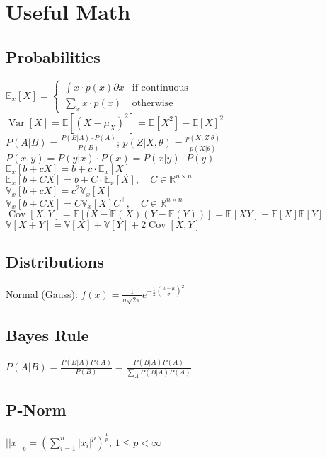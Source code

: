 \section*{Useful Math}

\subsection*{Probabilities}
$\mathbb{E}_x[X] = \begin{cases}
   \int x \cdot p(x) \partial x  & \text{if continuous}\\
   \sum_x x \cdot p(x) & \text{otherwise}
  \end{cases}$\\
$\operatorname{Var}[X] = \mathbb{E}[(X-\mu_X)^2] = \mathbb{E}[X^2] - \mathbb{E}[X]^2$\\
$P(A|B) = \frac{P(B|A) \cdot P(A)}{P(B)}$; $p(Z|X,\theta) = \frac{p(X,Z|\theta)}{p(X|\theta)}$\\
$P(x,y) = P(y|x) \cdot  P(x) = P(x|y) \cdot P(y)$ \\
$\mathbb{E}_x[b+ cX] = b+c\cdot \mathbb{E}_x[X]$ \\
$\mathbb{E}_x[b+ CX] = b+C\cdot\mathbb{E}_x[X],\quad C \in \mathbb{R}^{n\times n}$ \\
$\mathbb{V}_x[b+cX] = c^2\mathbb{V}_x[X]$\\
$\mathbb{V}_x[b+ CX] = C\mathbb{V}_x[X]C^\top,\quad C \in \mathbb{R}^{n\times n}$\\
$\operatorname{Cov}[X,Y] = \mathbb{E}[(X-\mathbb{E}(X)(Y-\mathbb{E}(Y))] =\mathbb{E}[XY]-\mathbb{E}[X]\mathbb{E}[Y]$ \\
$\mathbb{V}[X+Y] = \mathbb{V}[X]+\mathbb{V}[Y]+2\operatorname{Cov}[X,Y]$

\subsection*{Distributions}

Normal (Gauss): ${\displaystyle f(x)={\frac {1}{\sigma {\sqrt {2\pi }}}}e^{-{\frac {1}{2}}\left({\frac {x-\mu }{\sigma }}\right)^{2}}}$

\subsection*{Bayes Rule}
$P(A|B) = \frac{P(B|A)P(A)}{P(B)} = \frac{P(B|A)P(A)}{\sum_{A}P(B|A)P(A)}$

\subsection*{P-Norm}
$||x||_p = (\sum_{i=1}^n|x_i|^p)^{\frac{1}{p}}$, $1 \leq p < \infty$

